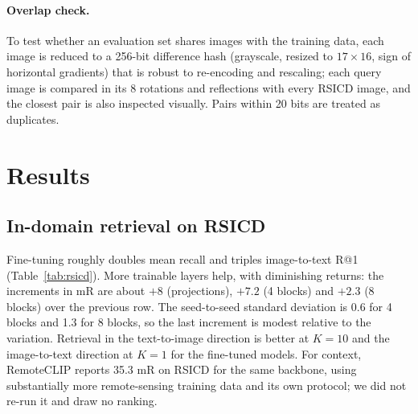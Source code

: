 \documentclass[11pt,a4paper]{article}
\begin{document}
\paragraph{Overlap check.}\label{sec:overlapmethod} To test whether an evaluation set shares images with the training data, each image is reduced to a 256-bit difference hash (grayscale, resized to $17\times16$, sign of horizontal gradients) that is robust to re-encoding and rescaling; each query image is compared in its 8 rotations and reflections with every RSICD image, and the closest pair is also inspected visually. Pairs within 20 bits are treated as duplicates.

\section{Results}
\subsection{In-domain retrieval on RSICD}
\begin{table}[t]
\centering\small
\caption{RSICD test split (1{,}093 images, 5{,}465 captions). Recall in \%. Mean $\pm$ sd over three seeds where indicated.}\label{tab:rsicd}
\end{table}
Fine-tuning roughly doubles mean recall and triples image-to-text R@1 (Table~\ref{tab:rsicd}). More trainable layers help, with diminishing returns: the increments in mR are about $+8$ (projections), $+7.2$ (4 blocks) and $+2.3$ (8 blocks) over the previous row. The seed-to-seed standard deviation is 0.6 for 4 blocks and 1.3 for 8 blocks, so the last increment is modest relative to the variation. Retrieval in the text-to-image direction is better at $K=10$ and the image-to-text direction at $K=1$ for the fine-tuned models. For context, RemoteCLIP \citep{liu2024remoteclip} reports 35.3 mR on RSICD for the same backbone, using substantially more remote-sensing training data and its own protocol; we did not re-run it and draw no ranking.
\end{document}
